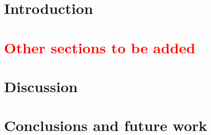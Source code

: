 \documentclass[3p,times,procedia]{elsarticle}
\begin{document}



\section{Introduction}\label{introduction}

\section{\textcolor{red}{Other sections to be added}}

\cite{2018_Dafonte} \cite{2018_Tolstikhin}

\section{Discussion}\label{discussion}

\section{Conclusions and future work}\label{conclusions}



\footnotesize{




} 
\end{document}
